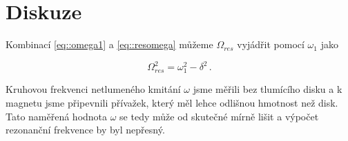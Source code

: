 \section*{Diskuze}
Kombinací \eqref{eq::omega1} a \eqref{eq::resomega} můžeme $\Omega_{res}$ vyjádřit pomocí $\omega_1$ jako

\begin{equation} \label{eq::omegaresalt}
\Omega_{res}^2 = \omega_1^2 - \delta^2 \,.
\end{equation}

Kruhovou frekvenci netlumeného kmitání $\omega$ jsme měřili bez tlumícího disku a k magnetu jsme připevnili přívažek, který měl lehce odlišnou hmotnost než disk.
Tato naměřená hodnota $\omega$ se tedy může od skutečné mírně lišit a výpočet rezonanční frekvence by byl nepřesný.
